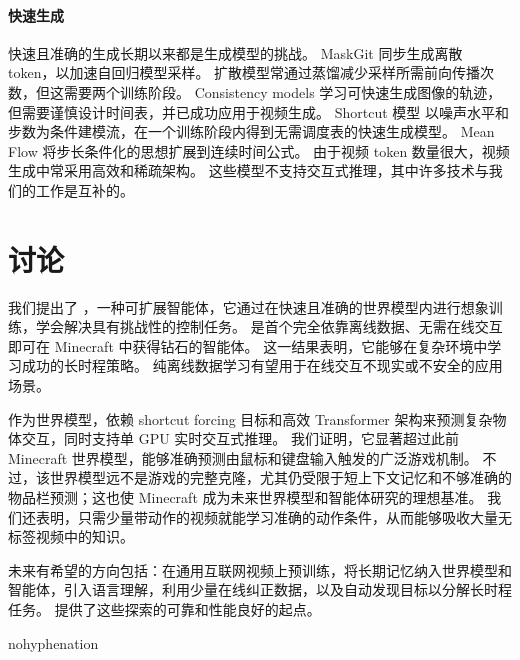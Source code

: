 \documentclass[11pt]{article}
\begin{document}
\paragraph{快速生成}

快速且准确的生成长期以来都是生成模型的挑战。
MaskGit 同步生成离散 token，以加速自回归模型采样\citep{chang2022maskgit}。
扩散模型常通过蒸馏减少采样所需前向传播次数\citep{salimans2022progressive,kodaira2025streamdit}，但这需要两个训练阶段。
Consistency models 学习可快速生成图像的轨迹，但需要谨慎设计时间表\citep{song2023consistency,song2023improved,lu2024simplifying}，并已成功应用于视频生成\citep{wang2023videolcm}。
Shortcut 模型\citep{shortcut} 以噪声水平和步数为条件建模流，在一个训练阶段内得到无需调度表的快速生成模型。
Mean Flow\citep{geng2025meanflow} 将步长条件化的思想扩展到连续时间公式。
由于视频 token 数量很大，视频生成中常采用高效和稀疏架构\citep{axial,zhao2024real,zhang2025vsa}。
这些模型不支持交互式推理，其中许多技术与我们的工作是互补的。

\section{讨论}

我们提出了 \method{}，一种可扩展智能体，它通过在快速且准确的世界模型内进行想象训练，学会解决具有挑战性的控制任务。
\method 是首个完全依靠离线数据、无需在线交互即可在 Minecraft 中获得钻石的智能体。
这一结果表明，它能够在复杂环境中学习成功的长时程策略。
纯离线数据学习有望用于在线交互不现实或不安全的应用场景。

作为世界模型，\method 依赖 shortcut forcing 目标和高效 Transformer 架构来预测复杂物体交互，同时支持单 GPU 实时交互式推理。
我们证明，它显著超过此前 Minecraft 世界模型，能够准确预测由鼠标和键盘输入触发的广泛游戏机制。
不过，该世界模型远不是游戏的完整克隆，尤其仍受限于短上下文记忆和不够准确的物品栏预测；这也使 Minecraft 成为未来世界模型和智能体研究的理想基准。
我们还表明，\method 只需少量带动作的视频就能学习准确的动作条件，从而能够吸收大量无标签视频中的知识。

未来有希望的方向包括：在通用互联网视频上预训练，将长期记忆纳入世界模型和智能体，引入语言理解，利用少量在线纠正数据，以及自动发现目标以分解长时程任务。
\method 提供了这些探索的可靠和性能良好的起点。

\clearpage
\begin{hyphenrules}{nohyphenation}
\setlength{\bibsep}{.5ex plus .5ex}

\end{hyphenrules}

\clearpage
\appendix

\end{document}
